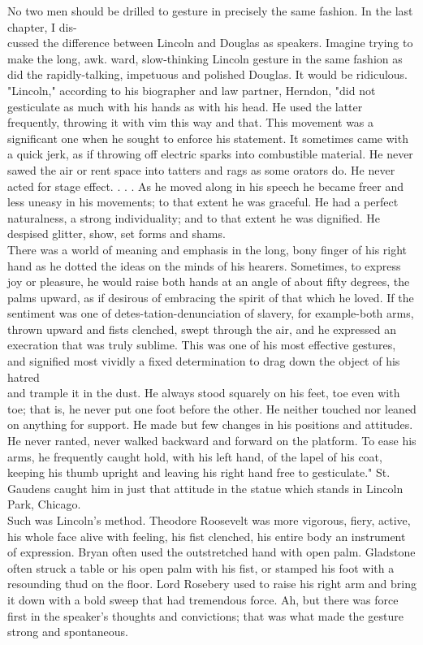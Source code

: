\documentclass[10pt]{article}
\begin{document}
No two men should be drilled to gesture in precisely the same fashion. In the last chapter, I dis-\\
cussed the difference between Lincoln and Douglas as speakers. Imagine trying to make the long, awk. ward, slow-thinking Lincoln gesture in the same fashion as did the rapidly-talking, impetuous and polished Douglas. It would be ridiculous.\\
"Lincoln," according to his biographer and law partner, Herndon, "did not gesticulate as much with his hands as with his head. He used the latter frequently, throwing it with vim this way and that. This movement was a significant one when he sought to enforce his statement. It sometimes came with a quick jerk, as if throwing off electric sparks into combustible material. He never sawed the air or rent space into tatters and rags as some orators do. He never acted for stage effect. . . . As he moved along in his speech he became freer and less uneasy in his movements; to that extent he was graceful. He had a perfect naturalness, a strong individuality; and to that extent he was dignified. He despised glitter, show, set forms and shams.\\
There was a world of meaning and emphasis in the long, bony finger of his right hand as he dotted the ideas on the minds of his hearers. Sometimes, to express joy or pleasure, he would raise both hands at an angle of about fifty degrees, the palms upward, as if desirous of embracing the spirit of that which he loved. If the sentiment was one of detes-tation-denunciation of slavery, for example-both arms, thrown upward and fists clenched, swept through the air, and he expressed an execration that was truly sublime. This was one of his most effective gestures, and signified most vividly a fixed determination to drag down the object of his hatred\\
and trample it in the dust. He always stood squarely on his feet, toe even with toe; that is, he never put one foot before the other. He neither touched nor leaned on anything for support. He made but few changes in his positions and attitudes. He never ranted, never walked backward and forward on the platform. To ease his arms, he frequently caught hold, with his left hand, of the lapel of his coat, keeping his thumb upright and leaving his right hand free to gesticulate." St. Gaudens caught him in just that attitude in the statue which stands in Lincoln Park, Chicago.\\
Such was Lincoln's method. Theodore Roosevelt was more vigorous, fiery, active, his whole face alive with feeling, his fist clenched, his entire body an instrument of expression. Bryan often used the outstretched hand with open palm. Gladstone often struck a table or his open palm with his fist, or stamped his foot with a resounding thud on the floor. Lord Rosebery used to raise his right arm and bring it down with a bold sweep that had tremendous force. Ah, but there was force first in the speaker's thoughts and convictions; that was what made the gesture strong and spontaneous.
\end{document}
